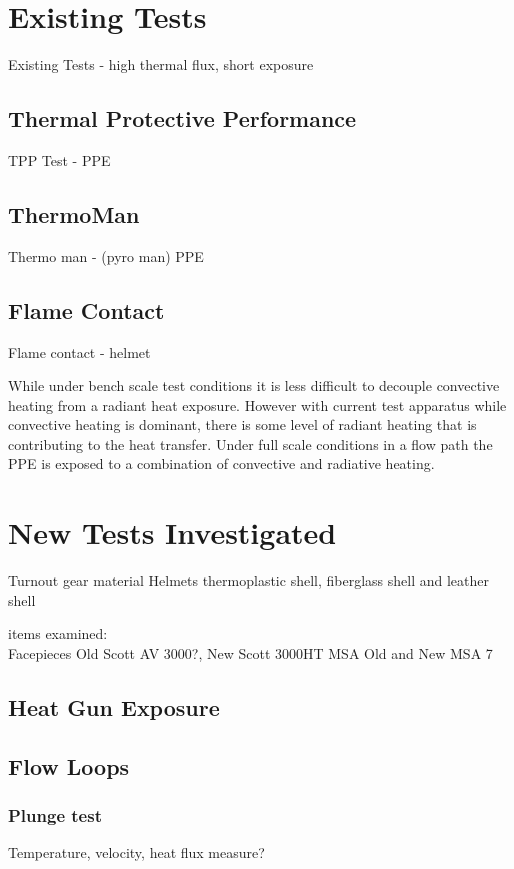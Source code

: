 \documentclass[12pt,oneside]{book}
\begin{document}
\chapter{Existing Tests}

Existing Tests - high thermal flux, short exposure

\section{Thermal Protective Performance}
TPP Test - PPE

\section{ThermoMan}
Thermo man - (pyro man) PPE

\section{Flame Contact}
Flame contact - helmet

While under bench scale test conditions it is less difficult to decouple convective heating from a radiant heat exposure.  However with current test apparatus while convective heating is dominant, there is some level of radiant heating that is contributing to the heat transfer.
Under full scale conditions in a flow path the PPE is exposed to a combination of convective and radiative heating.

\chapter{New Tests Investigated}
Turnout gear material
Helmets    thermoplastic shell, fiberglass shell and leather shell

items examined:\\
Facepieces
Old Scott AV 3000?,  New Scott 3000HT
MSA Old  and New MSA 7\\


\section{Heat Gun Exposure}

\section{Flow Loops}

\subsection{Plunge test}
		Temperature, velocity, heat flux measure?
\end{document}
